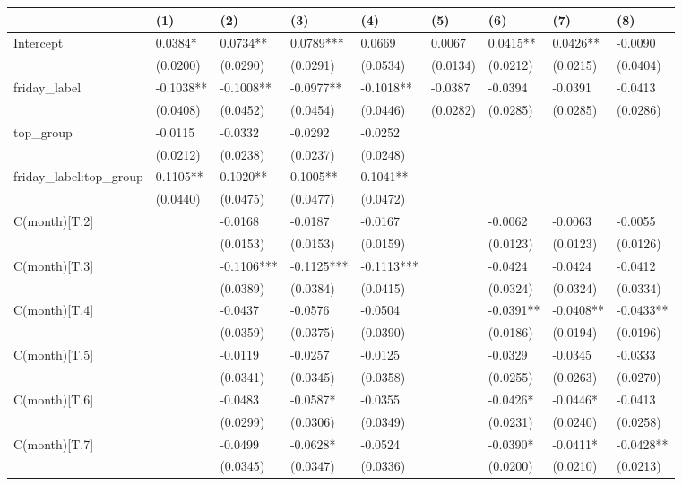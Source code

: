 \begin{tabular}{lllllllll}
\toprule
 & (1) & (2) & (3) & (4) & (5) & (6) & (7) & (8) \\
\midrule
Intercept & 0.0384* & 0.0734** & 0.0789*** & 0.0669 & 0.0067 & 0.0415** & 0.0426** & -0.0090 \\
 & (0.0200) & (0.0290) & (0.0291) & (0.0534) & (0.0134) & (0.0212) & (0.0215) & (0.0404) \\
friday_label & -0.1038** & -0.1008** & -0.0977** & -0.1018** & -0.0387 & -0.0394 & -0.0391 & -0.0413 \\
 & (0.0408) & (0.0452) & (0.0454) & (0.0446) & (0.0282) & (0.0285) & (0.0285) & (0.0286) \\
top_group & -0.0115 & -0.0332 & -0.0292 & -0.0252 &  &  &  &  \\
 & (0.0212) & (0.0238) & (0.0237) & (0.0248) &  &  &  &  \\
friday_label:top_group & 0.1105** & 0.1020** & 0.1005** & 0.1041** &  &  &  &  \\
 & (0.0440) & (0.0475) & (0.0477) & (0.0472) &  &  &  &  \\
C(month)[T.2] &  & -0.0168 & -0.0187 & -0.0167 &  & -0.0062 & -0.0063 & -0.0055 \\
 &  & (0.0153) & (0.0153) & (0.0159) &  & (0.0123) & (0.0123) & (0.0126) \\
C(month)[T.3] &  & -0.1106*** & -0.1125*** & -0.1113*** &  & -0.0424 & -0.0424 & -0.0412 \\
 &  & (0.0389) & (0.0384) & (0.0415) &  & (0.0324) & (0.0324) & (0.0334) \\
C(month)[T.4] &  & -0.0437 & -0.0576 & -0.0504 &  & -0.0391** & -0.0408** & -0.0433** \\
 &  & (0.0359) & (0.0375) & (0.0390) &  & (0.0186) & (0.0194) & (0.0196) \\
C(month)[T.5] &  & -0.0119 & -0.0257 & -0.0125 &  & -0.0329 & -0.0345 & -0.0333 \\
 &  & (0.0341) & (0.0345) & (0.0358) &  & (0.0255) & (0.0263) & (0.0270) \\
C(month)[T.6] &  & -0.0483 & -0.0587* & -0.0355 &  & -0.0426* & -0.0446* & -0.0413 \\
 &  & (0.0299) & (0.0306) & (0.0349) &  & (0.0231) & (0.0240) & (0.0258) \\
C(month)[T.7] &  & -0.0499 & -0.0628* & -0.0524 &  & -0.0390* & -0.0411* & -0.0428** \\
 &  & (0.0345) & (0.0347) & (0.0336) &  & (0.0200) & (0.0210) & (0.0213) \\

\end{tabular}

